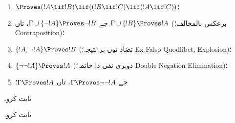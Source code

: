 \documentclass[../../../include/open-logic-section]{subfiles}
\begin{document}
\begin{prop}
\begin{enumerate}
\item $\Proves (!A \lif !B) \lif ((!B \lif !C)
  \lif (!A \lif !C))$؛ 
\item جے $\Gamma \cup \{ \lnot !A\}
  \Proves \lnot !B$، تاں $\Gamma \cup \{ !B\} \Proves
  !A$ (برعکس بالمخالف؛ Contraposition)؛ 
\item $\{ !A, \lnot!A\} \Proves
    !B$ (تضاد توں ہر نتیجہ؛ Ex Falso Quodlibet, Explosion)؛ 
\item $\{ \lnot\lnot!A\} \Proves
  !A$ (دوہری نفی دا خاتمہ؛ Double Negation Elimination)؛
\item جے $\Gamma \Proves \lnot\lnot!A$، تاں $\Gamma \Proves
  !A$؛
\end{enumerate}
\end{prop}

\begin{prob}
   ثابت کرو۔
\end{prob}
\tagendprob

\begin{prob}
   ثابت کرو۔
\end{prob}
\tagendprob
\end{document}
